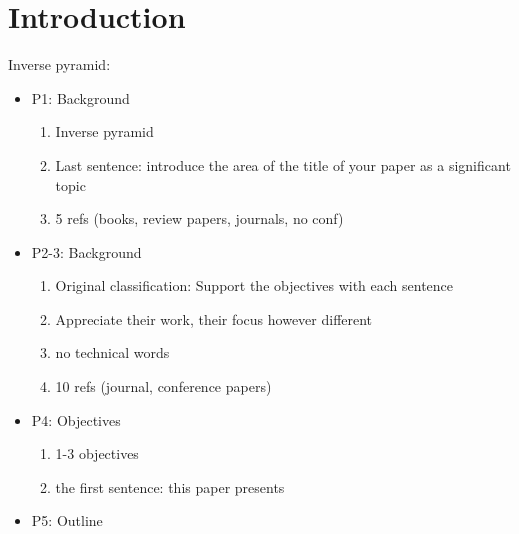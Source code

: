 \section{Introduction}
  Inverse pyramid:
  \begin{itemize}
    \item P1: Background
    \begin{enumerate}
      \item Inverse pyramid
      \item Last sentence: introduce the area of the title of your paper as a significant topic
      \item 5 refs (books, review papers, journals, no conf)
    \end{enumerate}
    \item P2-3: Background
    \begin{enumerate}
      \item Original classification: Support the objectives with each sentence
      \item Appreciate their work, their focus however different
      \item no technical words
      \item 10 refs (journal, conference papers)
    \end{enumerate}
    \item P4: Objectives
    \begin{enumerate}
      \item 1-3 objectives
      \item the first sentence: this paper presents
    \end{enumerate}
    \item P5: Outline
  \end{itemize}
